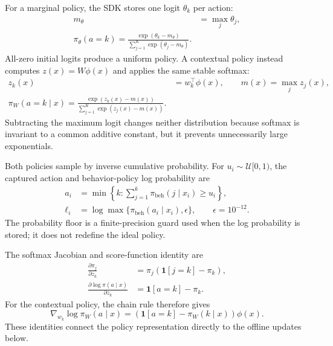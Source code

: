 \documentclass[conference]{IEEEtran}
\begin{document}
For a marginal policy, the SDK stores one logit $\theta_k$ per action:
\begin{equation}
\begin{aligned}
m_\theta &= \max_j \theta_j, \\
\pi_\theta(a=k) =
\frac{\exp(\theta_k-m_\theta)}
{\sum_{j=1}^{K}\exp(\theta_j-m_\theta)}.
\end{aligned}
\label{eq:marginal-softmax}
\end{equation}
All-zero initial logits produce a uniform policy. A contextual policy
instead computes $z(x)=W\phi(x)$ and applies the same stable
softmax:
\begin{equation}
\begin{aligned}
z_k(x)&=w_k^\top\phi(x), \qquad m(x)=\max_j z_j(x),\\
\pi_W(a=k\mid x) =
\frac{\exp(z_k(x)-m(x))}
{\sum_{j=1}^{K}\exp(z_j(x)-m(x))}.
\end{aligned}
\label{eq:contextual-softmax}
\end{equation}
Subtracting the maximum logit changes neither distribution because
softmax is invariant to a common additive constant, but it prevents
unnecessarily large exponentials.

Both policies sample by inverse cumulative probability. For
$u_i\sim\mathcal{U}[0,1)$, the captured action and behavior-policy
log probability are
\begin{equation}
\begin{aligned}
a_i&=\min\left\{k:\sum_{j=1}^{k}\pi_{\mathrm{beh}}(j\mid x_i)
\geq u_i\right\},\\
\ell_i&=\log\max\{\pi_{\mathrm{beh}}(a_i\mid x_i),\epsilon\},
\qquad \epsilon=10^{-12}.
\end{aligned}
\label{eq:sampling}
\end{equation}
The probability floor is a finite-precision guard used when the log
probability is stored; it does not redefine the ideal policy.

The softmax Jacobian and score-function identity are
\begin{equation}
\begin{aligned}
\frac{\partial \pi_j}{\partial z_k}
 &=\pi_j(\mathbf{1}[j=k]-\pi_k),\\
\frac{\partial\log\pi(a\mid x)}{\partial z_k}
 &=\mathbf{1}[a=k]-\pi_k.
\end{aligned}
\label{eq:softmax-score}
\end{equation}
For the contextual policy, the chain rule therefore gives
\begin{equation}
\nabla_{w_k}\log\pi_W(a\mid x)
=\left(\mathbf{1}[a=k]-\pi_W(k\mid x)\right)\phi(x).
\label{eq:contextual-score}
\end{equation}
These identities connect the policy representation directly to the
offline updates below.
\end{document}
